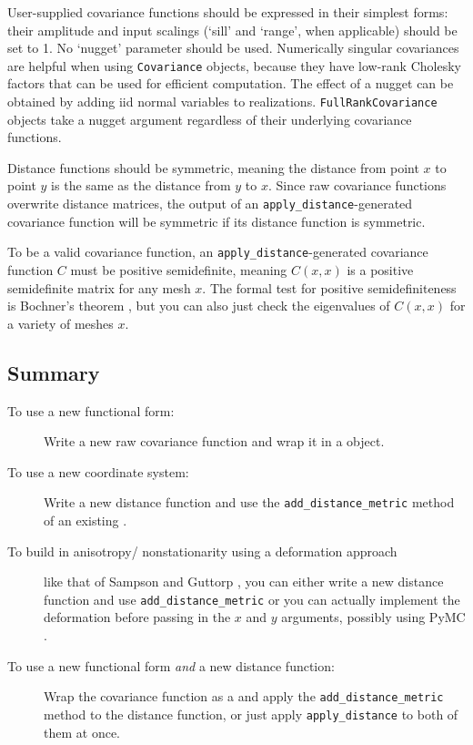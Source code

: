 \documentclass[]{manual}
\begin{document}
User-supplied covariance functions should be expressed in their simplest forms: their amplitude and input scalings (`sill' and `range', when applicable) should be set to 1. No `nugget' parameter should be used. Numerically singular covariances are helpful when using \texttt{Covariance} objects, because they have low-rank Cholesky factors that can be used for efficient computation. The effect of a nugget can be obtained by adding iid normal variables to realizations. \texttt{FullRankCovariance} objects take a nugget argument regardless of their underlying covariance functions.

Distance functions should be symmetric, meaning the distance from point $x$ to point $y$ is the same as the distance from $y$ to $x$. Since raw covariance functions overwrite distance matrices, the output of an \texttt{apply_distance}-generated covariance function will be symmetric if its distance function is symmetric.

To be a valid covariance function, an \texttt{apply_distance}-generated covariance function $C$ must be positive semidefinite, meaning $C(x,x)$ is a positive semidefinite matrix for any mesh $x$. The formal test for positive semidefiniteness is Bochner's theorem \cite{stein}, but you can also just check the eigenvalues of $C(x,x)$ for a variety of meshes $x$.



\subsection{Summary}\label{sec:cookbook}
\begin{description}
    \item[To use a new functional form:] Write a new raw covariance function and wrap it in a  object.
    \item[To use a new coordinate system:] Write a new distance function and use the \texttt{add_distance_metric} method of an existing .
    \item[To build in anisotropy/ nonstationarity using a deformation approach] like that of Sampson and Guttorp \cite{sampson}, you can either write a new distance function and use \texttt{add_distance_metric} or you can actually implement the deformation before passing in the $x$ and $y$ arguments, possibly using PyMC .
    \item[To use a new functional form \emph{and} a new distance function:] Wrap the covariance function as a  and apply the \texttt{add_distance_metric} method to the distance function, or just apply \texttt{apply_distance} to both of them at once.
\end{description}
\end{document}

